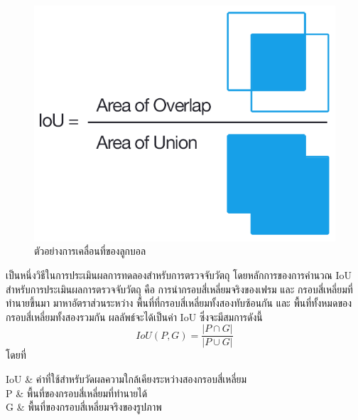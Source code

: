 
\begin{figure}[!ht]
	\centering
	\includegraphics[scale=0.5]{chapter2/images/iou_equation.png}
		\caption{ตัวอย่างการเคลื่อนที่ของลูกบอล}
    	\label{fig:iou_equation}
\end{figure}

เป็นหนึ่งวิธีในการประเมินผลการทดลองสำหรับการตรวจจับวัตถุ โดยหลักการของการคำนวณ IoU สำหรับการประเมินผลการตรวจจับวัตถุ คือ การนำกรอบสี่เหลี่ยมจริงของเฟรม และ กรอบสี่เหลี่ยมที่ทำนายขึ้นมา มาหาอัตราส่วนระหว่าง พื้นที่ที่กรอบสี่เหลี่ยมทั้งสองทับซ้อนกัน และ พื้นที่ทั้งหมดของกรอบสี่เหลี่ยมทั้งสองรวมกัน ผลลัพธ์จะได้เป็นค่า IoU ซึ่งจะมีสมการดังนี้
\begin{equation}
IoU(P,G) = \frac{\left| P \cap G \right|}{\left| P \cup  G \right|}					
\end{equation}
โดยที่
\begin{conditions}
IoU			&  ค่าที่ใช้สำหรับวัดผลความใกล้เคียงระหว่างสองกรอบสี่เหลี่ยม    \\
P			&  พื้นที่ของกรอบสี่เหลี่ยมที่ทำนายได้	\\
G			&  พื้นที่ของกรอบสี่เหลี่ยมจริงของรูปภาพ					\\
\end{conditions}

